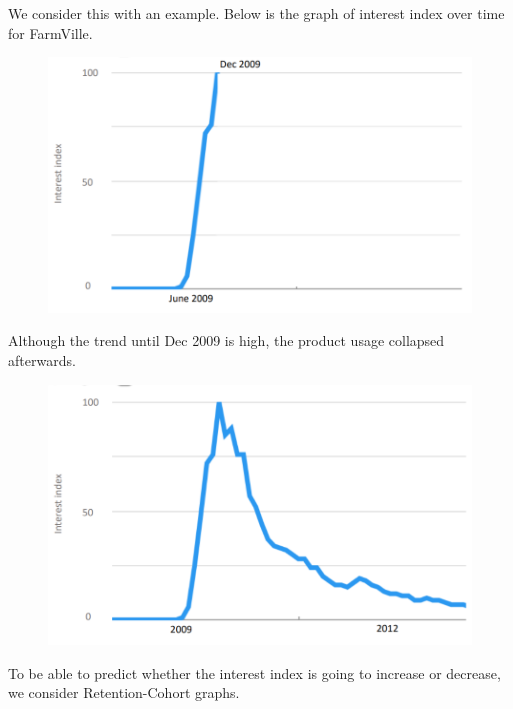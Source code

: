 \documentclass[a4paper, openany]{memoir}
\begin{document}
We consider this with an example. Below is the graph of interest index over time for FarmVille.
\begin{figure}[H]
    \centering
    \includegraphics[scale=0.5]{src/18.7 FarmVille interest index (pre-fall).PNG}
\end{figure}
\noindent Although the trend until Dec 2009 is high, the product usage collapsed afterwards.
\begin{figure}[H]
    \centering
    \includegraphics[scale=0.5]{src/18.8 FarmVille interest index (complete).PNG}
\end{figure}
\noindent To be able to predict whether the interest index is going to increase or decrease, we consider Retention-Cohort graphs.
\end{document}
